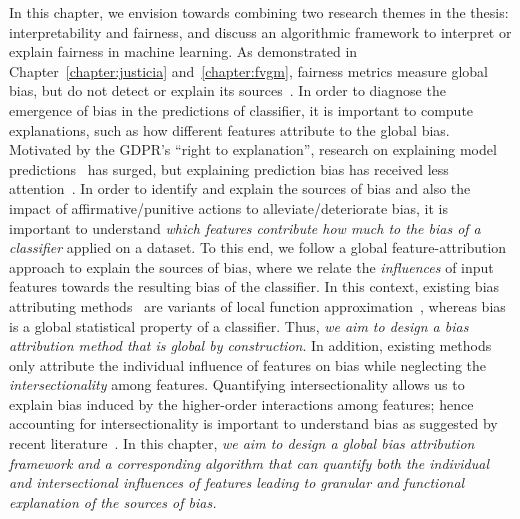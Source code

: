 In this chapter, we envision towards combining two research themes in the thesis: interpretability and fairness, and discuss an algorithmic framework to interpret or explain fairness in machine learning.
As demonstrated in Chapter~\ref{chapter:justicia} and~\ref{chapter:fvgm}, fairness metrics measure global bias, but do not detect or explain its sources~\cite{begley2020explainability,lundberg2020explaining,pan2021explaining}.
In order to diagnose the emergence of bias in the predictions of classifier, it is important to compute explanations, such as how different features attribute to the global bias. Motivated by the GDPR's ``right to explanation'', research on explaining model predictions~\cite{ribeiro2016should,lundberg2017unified,lundberg2020local2global} has surged, but explaining prediction bias has received less attention~\cite{begley2020explainability,lundberg2020explaining}. In order to identify and explain the sources of bias and also the impact of affirmative/punitive actions to alleviate/deteriorate bias, it is important to understand \textit{which features contribute how much to the bias of a classifier} applied on a dataset. To this end, we follow a global feature-attribution approach to explain the sources of bias, where we relate the \emph{influences} of input features towards the resulting bias of the classifier. In this context, existing bias attributing methods~\cite{begley2020explainability,lundberg2020explaining} are variants of local function approximation~\cite{sliwinski2019axiomatic}, whereas bias is a global statistical property of a classifier. Thus, \textit{we aim to design a bias attribution method that is global by construction}. In addition, existing methods only attribute the individual influence of features on bias while neglecting the \textit{intersectionality} among features. Quantifying intersectionality allows us to explain bias induced by the higher-order interactions among features; hence accounting for intersectionality is important to understand bias as suggested by recent literature~\cite{buolamwini2018gender,wang2022towards}. 
In this chapter, \textit{we aim to design a global bias attribution framework and a corresponding algorithm that can quantify both the individual and intersectional influences of features leading to granular and functional explanation of the sources of bias.}


